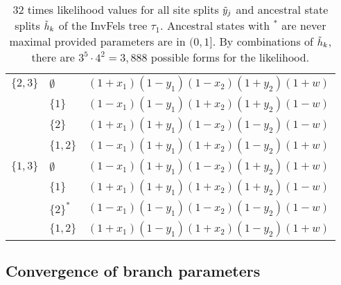 \begin{table}
\begin{tabular}{|l|ll|}
$\{2,3\}$  &$\emptyset$&$(1+x_1)(1-y_1)(1-x_2)(1+y_2)(1+w)$\\
&$\{1\}$&$(1-x_1)(1-y_1)(1+x_2)(1+y_2)(1-w)$               \\
&$\{2\}$&$(1+x_1)(1+y_1)(1-x_2)(1-y_2)(1-w)$               \\
&$\{1,2\}$&$(1-x_1)(1+y_1)(1+x_2)(1-y_2)(1+w)$             \\

$\{1,3\}$  &$\emptyset$&$(1-x_1)(1+y_1)(1-x_2)(1+y_2)(1+w)$\\
&$\{1\}$&$(1+x_1)(1+y_1)(1+x_2)(1+y_2)(1-w)$               \\
&$\{2\}^*$&$(1-x_1)(1-y_1)(1-x_2)(1-y_2)(1-w)$             \\
&$\{1,2\}$&$(1+x_1)(1-y_1)(1+x_2)(1-y_2)(1+w)$             \\
\hline
\end{tabular}
\caption{
32 times likelihood values for all site splits $\tilde{y}_j$ and ancestral state splits $\tilde{h}_k$ of the InvFels tree $\tau_1$.
Ancestral states with $^*$ are never maximal provided parameters are in $(0,1]$.
By combinations of $\tilde{h}_k$, there are $3^5\cdot 4^2=3,888$ possible forms for the likelihood.
}
\label{tab:farris_likelihoods}
\end{table}


\subsection*{Convergence of branch parameters}

